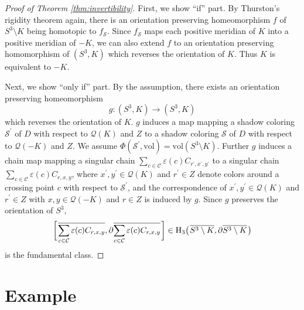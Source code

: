 \documentclass[12pt]{amsart}
\theoremstyle{definition}
\begin{document}
\begin{proof}[Proof of Theorem \ref{thm:invertibility}]
First, we show ``if'' part.
By Thurston's rigidity theorem again, there is an orientation preserving homeomorphism $f$ of $S^{3} \setminus K$ being homotopic to $f_{\mathcal{S}}$.
Since $f_{\mathcal{S}}$ maps each positive meridian of $K$ into a positive meridian of $-K$, we can also extend $f$ to an orientation preserving homomorphism of $(S^{3}, K)$ which reverses the orientation of $K$.
Thus $K$ is equivalent to $-K$.

Next, we show ``only if'' part.
By the assumption, there exists an orientation preserving homeomorphism
\[
 g : (S^{3}, K) \longrightarrow (S^{3}, K)
\]
which reverses the orientation of $K$.
$g$ induces a map mapping a shadow coloring $\mathcal{S}^{\prime}$ of $D$ with respect to $\mathcal{Q}(K)$ and $Z$ to a shadow coloring $\mathcal{S}$ of $D$ with respect to $\mathcal{Q}(-K)$ and $Z$.
We assume $\Phi(\mathcal{S}^{\prime}, \mathrm{vol}) = \mathrm{vol}(S^{3} \setminus K)$.
Further $g$ induces a chain map mapping a singular chain $\displaystyle \sum_{c \in \mathcal{C}} \varepsilon(c) C_{r^{\prime}, x^{\prime}, y^{\prime}}$ to a singular chain $\displaystyle \sum_{c \in \mathcal{C}} \varepsilon(c) C_{r, x, y}$, where $x^{\prime}, y^{\prime} \in \mathcal{Q}(K)$ and $r^{\prime} \in Z$ denote colors around a crossing point $c$ with respect to $\mathcal{S}^{\prime}$, and the correspondence of $x^{\prime}, y^{\prime} \in \mathcal{Q}(K)$ and $r^{\prime} \in Z$ with $x, y \in \mathcal{Q}(-K)$ and $r \in Z$ is induced by $g$.
Since $g$ preserves the orientation of $S^{3}$,
\[
 \biggl[ \hskip 0.1em \overline{\sum_{c \in \mathcal{C}} \varepsilon(c) C_{r, x, y}}, \partial \overline{\sum_{c \in \mathcal{C}} \varepsilon(c) C_{r, x, y}} \hskip 0.1em \biggr] \in \mathrm{H}_{3} \bigl( \hskip 0.1em \overline{S^{3} \setminus K}, \partial \overline{S^{3} \setminus K} \hskip 0.1em \bigr)
\]
is the fundamental class.
\end{proof}

\section{Example}\label{sec:example}
\end{document}
